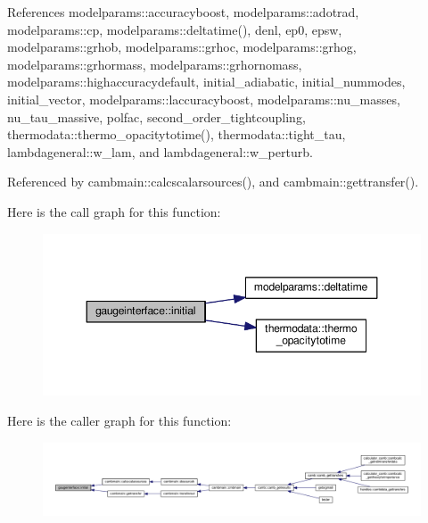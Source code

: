 References modelparams\+::accuracyboost, modelparams\+::adotrad, modelparams\+::cp, modelparams\+::deltatime(), denl, ep0, epsw, modelparams\+::grhob, modelparams\+::grhoc, modelparams\+::grhog, modelparams\+::grhormass, modelparams\+::grhornomass, modelparams\+::highaccuracydefault, initial\+\_\+adiabatic, initial\+\_\+nummodes, initial\+\_\+vector, modelparams\+::laccuracyboost, modelparams\+::nu\+\_\+masses, nu\+\_\+tau\+\_\+massive, polfac, second\+\_\+order\+\_\+tightcoupling, thermodata\+::thermo\+\_\+opacitytotime(), thermodata\+::tight\+\_\+tau, lambdageneral\+::w\+\_\+lam, and lambdageneral\+::w\+\_\+perturb.



Referenced by cambmain\+::calcscalarsources(), and cambmain\+::gettransfer().

Here is the call graph for this function\+:
\nopagebreak
\begin{figure}[H]
\begin{center}
\leavevmode
\includegraphics[width=348pt]{namespacegaugeinterface_aa05aaad2bec1907778ea8eae3a7ba521_cgraph}
\end{center}
\end{figure}
Here is the caller graph for this function\+:
\nopagebreak
\begin{figure}[H]
\begin{center}
\leavevmode
\includegraphics[width=350pt]{namespacegaugeinterface_aa05aaad2bec1907778ea8eae3a7ba521_icgraph}
\end{center}
\end{figure}
\mbox{\label{namespacegaugeinterface_afbc0a211756e4b923725483b6c961e75}} 
